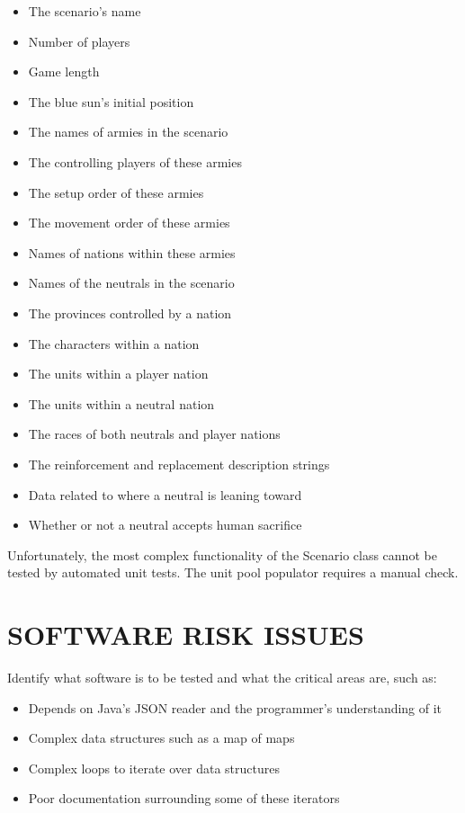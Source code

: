 {\color{black}
\begin{itemize}
\item The scenario's name
\item Number of players
\item Game length
\item The blue sun's initial position
\item The names of armies in the scenario
\item The controlling players of these armies
\item The setup order of these armies
\item The movement order of these armies
\item Names of nations within these armies
\item Names of the neutrals in the scenario
\item The provinces controlled by a nation
\item The characters within a nation
\item The units within a player nation
\item The units within a neutral nation
\item The races of both neutrals and player nations
\item The reinforcement and replacement description strings
\item Data related to where a neutral is leaning toward
\item Whether or not a neutral accepts human sacrifice
\end{itemize}
}

{\color{black}
Unfortunately, the most complex functionality of the Scenario class 
cannot be tested by automated unit tests. The unit pool populator requires 
a manual check. }

\section[SOFTWARE RISK ISSUES]{\bfseries\color{black} SOFTWARE RISK ISSUES}
{\color{black}

Identify what software is to be tested and what the critical areas
are, such as:

\begin{itemize}
\item Depends on Java's JSON reader and the programmer's understanding of it
\item Complex data structures such as a map of maps
\item Complex loops to iterate over data structures
\item Poor documentation surrounding some of these iterators
\end{itemize}
}

